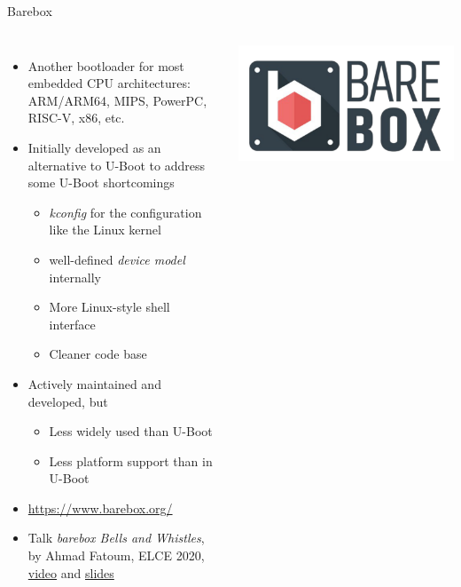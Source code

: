 \begin{frame}{Barebox}
  \begin{columns}
    \begin{itemize}
    \item Another bootloader for most embedded CPU architectures:
      ARM/ARM64, MIPS, PowerPC, RISC-V, x86, etc.
    \item Initially developed as an alternative to U-Boot to address
      some U-Boot shortcomings
      \begin{itemize}
      \item {\em kconfig} for the configuration like the Linux kernel
      \item well-defined {\em device model} internally
      \item More Linux-style shell interface
      \item Cleaner code base
      \end{itemize}
    \item Actively maintained and developed, but
      \begin{itemize}
      \item Less widely used than U-Boot
      \item Less platform support than in U-Boot
      \end{itemize}
    \item \url{https://www.barebox.org/}
    \item Talk {\em barebox Bells and Whistles}, by Ahmad Fatoum, ELCE
      2020, \href{https://youtu.be/Oj7lKbFtyM0}{video} and
      \href{https://elinux.org/images/9/9d/Barebox-bells-n-whistles.pdf}{slides}
    \end{itemize}
    \includegraphics[width=\textwidth]{slides/sysdev-bootloaders-sequence/barebox.png}
  \end{columns}
\end{frame}

